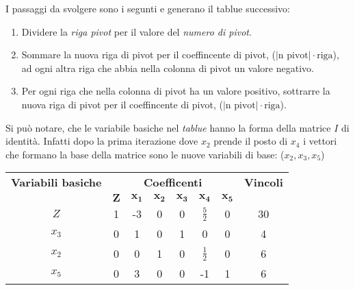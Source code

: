 \documentclass{article}
\begin{document}
I passaggi da svolgere sono i segunti e generano il tablue successivo:
\begin{enumerate}
  \item Dividere la \textit{riga pivot} per il valore del \textit{numero di pivot}.
  \item Sommare la nuova riga di pivot per il coeffincente di pivot, ($|\text{n pivot}|\cdot \text{riga}$), ad ogni altra riga che abbia nella colonna di pivot un valore negativo.
  \item Per ogni riga che nella colonna di pivot ha un valore positivo, sottrarre la nuova riga di pivot per il coeffincente di pivot, ($|\text{n pivot}|\cdot \text{riga}$).
\end{enumerate}
\begin{tcolorbox}[
    colback=lightgray,
    colframe=black,
    coltext=black,
    title=Attenzione,
    colbacktitle=black,
    coltitle=lightgray,
    breakable
  ]
  Si può notare, che le variabile basiche nel \textit{tablue} hanno la forma della matrice $I$ di identità. Infatti dopo la prima iterazione dove $x_2$ prende il posto di $x_4$ i vettori che formano la base della matrice sono le nuove variabili di base: ($x_2, x_3, x_5$)
\end{tcolorbox}

\begin{table}[h]
  \centering
  \begin{tabular}{|c|c|c|c|c|c|c|c|}
    \hline
    {\textbf{Variabili basiche}} & \multicolumn{6}{|c|}{\textbf{Coefficenti}} & \textbf{Vincoli}                                                                          \\
    \cline{1-8}
                                 & $\mathbf{Z}$                               & $\mathbf{x_1}$   & $\mathbf{x_2}$ & $\mathbf{x_3}$ & $\mathbf{x_4}$ & $\mathbf{x_5}$ &    \\
    \hline
    $Z$                          & 1                                          & -3               & 0              & 0              & $\frac{5}{2}$  & 0              & 30 \\
    $x_3$                        & 0                                          & 1                & 0              & 1              & 0              & 0              & 4  \\
    $x_2$                        & 0                                          & 0                & 1              & 0              & $\frac{1}{2}$  & 0              & 6  \\
    $x_5$                        & 0                                          & 3                & 0              & 0              & -1             & 1              & 6  \\
    \hline
  \end{tabular}
\end{table}
\end{document}
